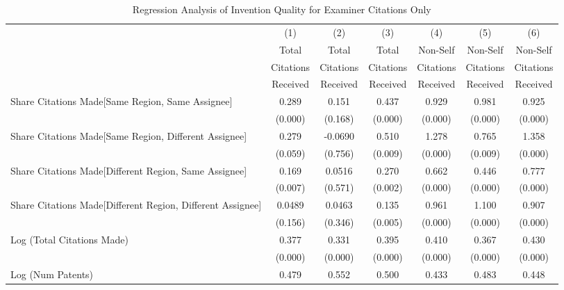 \documentclass[12pt,letterpaper]{article}
\begin{document}
\begin{table}[htbp]\centering \caption{Regression Analysis of Invention Quality for Examiner Citations Only \label{e.model123192021}}
\scriptsize
\singlespacing
\begin{tabular}{l*{6}{c}} \hline
                &\multicolumn{1}{c}{(1)}&\multicolumn{1}{c}{(2)}&\multicolumn{1}{c}{(3)}&\multicolumn{1}{c}{(4)}&\multicolumn{1}{c}{(5)}&\multicolumn{1}{c}{(6)}\\
                &\multicolumn{1}{c}{Total}&\multicolumn{1}{c}{Total}&\multicolumn{1}{c}{Total}&\multicolumn{1}{c}{Non-Self}&\multicolumn{1}{c}{Non-Self}&\multicolumn{1}{c}{Non-Self}\\
                &\multicolumn{1}{c}{Citations}&\multicolumn{1}{c}{Citations}&\multicolumn{1}{c}{Citations}&\multicolumn{1}{c}{Citations}&\multicolumn{1}{c}{Citations}&\multicolumn{1}{c}{Citations}\\
                 &\multicolumn{1}{c}{Received}&\multicolumn{1}{c}{Received}&\multicolumn{1}{c}{Received}&\multicolumn{1}{c}{Received}&\multicolumn{1}{c}{Received}&\multicolumn{1}{c}{Received}\\
\hline
Share Citations Made[Same Region, Same Assignee]&    0.289&    0.151&    0.437&    0.929&    0.981&    0.925\\
                &  (0.000)&  (0.168)&  (0.000)&  (0.000)&  (0.000)&  (0.000)\\
Share Citations Made[Same Region, Different Assignee]&    0.279&  -0.0690&    0.510&    1.278&    0.765&    1.358\\
                &  (0.059)&  (0.756)&  (0.009)&  (0.000)&  (0.009)&  (0.000)\\
Share Citations Made[Different Region, Same Assignee]&    0.169&   0.0516&    0.270&    0.662&    0.446&    0.777\\
                &  (0.007)&  (0.571)&  (0.002)&  (0.000)&  (0.000)&  (0.000)\\
Share Citations Made[Different Region, Different Assignee]&   0.0489&   0.0463&    0.135&    0.961&    1.100&    0.907\\
                &  (0.156)&  (0.346)&  (0.005)&  (0.000)&  (0.000)&  (0.000)\\
Log (Total Citations Made)&    0.377&    0.331&    0.395&    0.410&    0.367&    0.430\\
                &  (0.000)&  (0.000)&  (0.000)&  (0.000)&  (0.000)&  (0.000)\\
Log (Num Patents)&    0.479&    0.552&    0.500&    0.433&    0.483&    0.448\\

\end{tabular}
\end{table}
\end{document}
